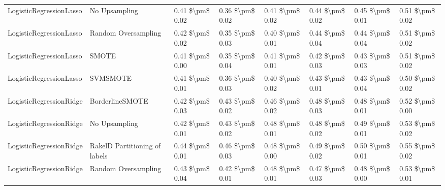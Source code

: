 \begin{tabular}{llllllll}
        LogisticRegressionLasso &                 No Upsampling & 0.41 \$\textbackslash pm\$ 0.02 &           0.36 \$\textbackslash pm\$ 0.02 &       0.41 \$\textbackslash pm\$ 0.02 &        0.44 \$\textbackslash pm\$ 0.02 &                         0.45 \$\textbackslash pm\$ 0.01 &     0.51 \$\textbackslash pm\$ 0.02 \\
        LogisticRegressionLasso &           Random Oversampling & 0.42 \$\textbackslash pm\$ 0.02 &           0.35 \$\textbackslash pm\$ 0.03 &       0.40 \$\textbackslash pm\$ 0.01 &        0.44 \$\textbackslash pm\$ 0.04 &                         0.44 \$\textbackslash pm\$ 0.04 &     0.51 \$\textbackslash pm\$ 0.02 \\
        LogisticRegressionLasso &                         SMOTE & 0.41 \$\textbackslash pm\$ 0.00 &           0.35 \$\textbackslash pm\$ 0.04 &       0.41 \$\textbackslash pm\$ 0.01 &        0.42 \$\textbackslash pm\$ 0.03 &                         0.43 \$\textbackslash pm\$ 0.03 &     0.51 \$\textbackslash pm\$ 0.02 \\
        LogisticRegressionLasso &                      SVMSMOTE & 0.41 \$\textbackslash pm\$ 0.01 &           0.36 \$\textbackslash pm\$ 0.03 &       0.40 \$\textbackslash pm\$ 0.02 &        0.43 \$\textbackslash pm\$ 0.01 &                         0.43 \$\textbackslash pm\$ 0.04 &     0.50 \$\textbackslash pm\$ 0.02 \\
        LogisticRegressionRidge &               BorderlineSMOTE & 0.42 \$\textbackslash pm\$ 0.03 &           0.43 \$\textbackslash pm\$ 0.02 &       0.46 \$\textbackslash pm\$ 0.02 &        0.48 \$\textbackslash pm\$ 0.03 &                         0.48 \$\textbackslash pm\$ 0.01 &     0.52 \$\textbackslash pm\$ 0.00 \\
        LogisticRegressionRidge &                 No Upsampling & 0.42 \$\textbackslash pm\$ 0.01 &           0.43 \$\textbackslash pm\$ 0.02 &       0.48 \$\textbackslash pm\$ 0.01 &        0.48 \$\textbackslash pm\$ 0.02 &                         0.49 \$\textbackslash pm\$ 0.01 &     0.53 \$\textbackslash pm\$ 0.02 \\
        LogisticRegressionRidge & RakelD Partitioning of labels & 0.44 \$\textbackslash pm\$ 0.01 &           0.46 \$\textbackslash pm\$ 0.03 &       0.48 \$\textbackslash pm\$ 0.00 &        0.49 \$\textbackslash pm\$ 0.02 &                         0.50 \$\textbackslash pm\$ 0.01 &     0.55 \$\textbackslash pm\$ 0.02 \\
        LogisticRegressionRidge &           Random Oversampling & 0.43 \$\textbackslash pm\$ 0.04 &           0.42 \$\textbackslash pm\$ 0.01 &       0.48 \$\textbackslash pm\$ 0.01 &        0.47 \$\textbackslash pm\$ 0.03 &                         0.48 \$\textbackslash pm\$ 0.00 &     0.53 \$\textbackslash pm\$ 0.01 \\

\end{tabular}
